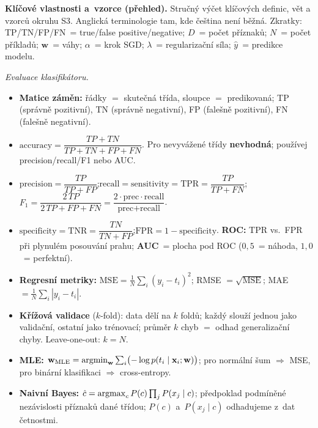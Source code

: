 \begin{poznamka}
\textbf{Klíčové vlastnosti a~vzorce (přehled).} Stručný výčet klíčových definic, vět a vzorců okruhu S3. Anglická terminologie tam, kde čeština není běžná. Zkratky: TP/TN/FP/FN~= true/false positive/negative; $D$~= počet příznaků; $N$~= počet příkladů; $\mathbf{w}$~= váhy; $\alpha$~= krok SGD; $\lambda$~= regularizační síla; $\hat y$~= predikce modelu.

\smallskip
\emph{Evaluace klasifikátoru.}
\begin{itemize}
  \item \textbf{Matice záměn:} řádky $=$ skutečná třída, sloupce $=$ predikovaná; TP (správně pozitivní), TN (správně negativní), FP (falešně pozitivní), FN (falešně negativní).
  \item $\mathrm{accuracy}=\dfrac{TP+TN}{TP+TN+FP+FN}$. Pro nevyvážené třídy \textbf{nevhodná}; používej precision/recall/F1 nebo AUC.
  \item $\mathrm{precision}=\dfrac{TP}{TP+FP}$;\quad $\mathrm{recall}=\mathrm{sensitivity}=\mathrm{TPR}=\dfrac{TP}{TP+FN}$;\quad $F_1=\dfrac{2\,TP}{2\,TP+FP+FN}=\dfrac{2\cdot\text{prec}\cdot\text{recall}}{\text{prec}+\text{recall}}$.
  \item $\mathrm{specificity}=\mathrm{TNR}=\dfrac{TN}{TN+FP}$;\quad $\mathrm{FPR}=1-\mathrm{specificity}$. \textbf{ROC:} TPR vs.\ FPR při plynulém posouvání prahu; \textbf{AUC}~= plocha pod ROC ($0{,}5$~= náhoda, $1{,}0$~= perfektní).
  \item \textbf{Regresní metriky:} $\mathrm{MSE}=\tfrac1N\sum_i(y_i-t_i)^2$; RMSE $=\sqrt{\mathrm{MSE}}$; MAE $=\tfrac1N\sum_i|y_i-t_i|$.
  \item \textbf{Křížová validace} ($k$-fold): data dělí na $k$ foldů; každý slouží jednou jako validační, ostatní jako trénovací; průměr $k$ chyb $=$ odhad generalizační chyby. Leave-one-out: $k=N$.
  \item \textbf{MLE:} $\mathbf{w}_\mathrm{MLE}=\operatorname*{argmin}_{\mathbf{w}}\sum_i\bigl(-\log p(t_i\mid\mathbf{x}_i;\mathbf{w})\bigr)$; pro normální šum $\Rightarrow$ MSE, pro binární klasifikaci $\Rightarrow$ cross-entropy.
  \item \textbf{Naivní Bayes:} $\hat c=\operatorname*{argmax}_c P(c)\prod_j P(x_j\mid c)$; předpoklad podmíněné nezávislosti příznaků dané třídou; $P(c)$ a~$P(x_j\mid c)$ odhadujeme z~dat četnostmi.
\end{itemize}


\end{poznamka}
